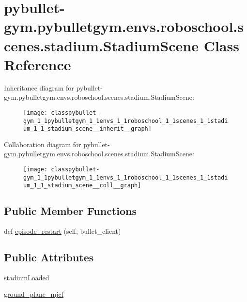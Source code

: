 \hypertarget{classpybullet-gym_1_1pybulletgym_1_1envs_1_1roboschool_1_1scenes_1_1stadium_1_1_stadium_scene}{}\section{pybullet-\/gym.pybulletgym.\+envs.\+roboschool.\+scenes.\+stadium.\+Stadium\+Scene Class Reference}
\label{classpybullet-gym_1_1pybulletgym_1_1envs_1_1roboschool_1_1scenes_1_1stadium_1_1_stadium_scene}


Inheritance diagram for pybullet-\/gym.pybulletgym.\+envs.\+roboschool.\+scenes.\+stadium.\+Stadium\+Scene\+:
\nopagebreak
\begin{figure}[H]
\begin{center}
\leavevmode
\texttt{[image: classpybullet-gym\_1\_1pybulletgym\_1\_1envs\_1\_1roboschool\_1\_1scenes\_1\_1stadium\_1\_1\_stadium\_scene\_\_inherit\_\_graph]}
\end{center}
\end{figure}


Collaboration diagram for pybullet-\/gym.pybulletgym.\+envs.\+roboschool.\+scenes.\+stadium.\+Stadium\+Scene\+:
\nopagebreak
\begin{figure}[H]
\begin{center}
\leavevmode
\texttt{[image: classpybullet-gym\_1\_1pybulletgym\_1\_1envs\_1\_1roboschool\_1\_1scenes\_1\_1stadium\_1\_1\_stadium\_scene\_\_coll\_\_graph]}
\end{center}
\end{figure}
\subsection*{Public Member Functions}
\begin{DoxyCompactItemize}
\item 
def \hyperlink{classpybullet-gym_1_1pybulletgym_1_1envs_1_1roboschool_1_1scenes_1_1stadium_1_1_stadium_scene_a3713c935a3a58834f7e8ddc6cc9f3402}{episode\+\_\+restart} (self, bullet\+\_\+client)
\end{DoxyCompactItemize}
\subsection*{Public Attributes}
\begin{DoxyCompactItemize}
\item 
\hyperlink{classpybullet-gym_1_1pybulletgym_1_1envs_1_1roboschool_1_1scenes_1_1stadium_1_1_stadium_scene_a4ee1ab6a70707bb5cd52451c20df9fa5}{stadium\+Loaded}
\item 
\hyperlink{classpybullet-gym_1_1pybulletgym_1_1envs_1_1roboschool_1_1scenes_1_1stadium_1_1_stadium_scene_a3d9f6b065e4507100e44cac4d82f85fb}{ground\+\_\+plane\+\_\+mjcf}
\end{DoxyCompactItemize}
